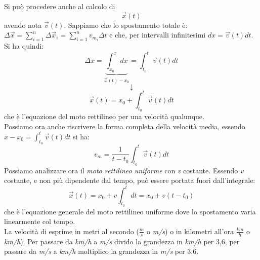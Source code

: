 \documentclass[a4paper,12pt, oneside]{book}
\begin{document}
Si può procedere anche al calcolo di $$\vec{x}(t)$$ avendo nota $\vec{v}(t)$. Sappiamo che lo spostamento totale è: $\Delta \vec{x}=\sum_{i=1}^n \Delta \vec{x}_i=\sum_{i=1}^n v_{m_i} \Delta t$ e che, per intervalli infinitesimi $dx=\vec{v}(t) dt$. Si ha quindi:
$$\Delta x=\underbrace{\int_{x_0}^x dx}_{\vec{x}(t)-x_0}=\int_{t_0}^t \vec{v}(t) dt$$
$$\downarrow$$
$$\vec{x}(t)=x_0+\int_{t_0}^t \vec{v}(t) dt$$
che è l'equazione del moto rettilineo per una velocità qualunque.\\
Possiamo ora anche riscrivere la forma completa della velocità media, essendo $x-x_0=\int_{t_0}^t \vec{v}(t) dt$ si ha:
$$v_m=\frac{1}{t-t_0}\int_{t_0}^t \vec{v}(t) dt$$
Possiamo analizzare ora il \textit{moto rettilineo uniforme} con \textit{v} costante. Essendo \textit{v} costante, e non più dipendente dal tempo, può essere portata fuori dall'integrale:
$$\vec{x}(t)=x_0+v\int_{t_0}^t dt=x_0+v(t-t_0)$$
che è l'equazione generale del moto rettilineo uniforme dove lo spostamento varia linearmente col tempo.\\
La velocità di esprime in metri al secondo ($\frac{m}{s}$ o \textit{m/s}) o in kilometri all'ora $\frac{km}{h}$ o \textit{km/h}). Per passare da \textit{km/h} a \textit{m/s} divido la grandezza in \textit{km/h} per 3,6, per passare da \textit{m/s} a \textit{km/h} moltiplico la grandezza in \textit{m/s} per 3,6.
\end{document}
